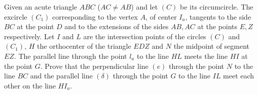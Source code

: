 Given an acute triangle  $ABC$ ($AC\ne AB$) and let $(C)$ be its circumcircle. The excircle $(C_1)$ corresponding to the vertex $A$,  of center $I_a$,  tangents to the side $BC$ at the point $D$ and to the extensions of the sides $AB,AC$ at the points $E,Z$ respectively. Let $I$ and $L$ are the intersection points of the circles $(C)$ and $(C_1)$,  $H$  the orthocenter of the triangle $EDZ$ and $N$ the midpoint of segment $EZ$. The parallel line through the point $l_a$ to the line $HL$ meets the line $HI$ at the point $G$. Prove that the perpendicular line $(e)$ through the point $N$ to the line $BC$ and the parallel line $(\delta)$ through the point $G$ to the line $IL$ meet each other on the line $HI_a$.